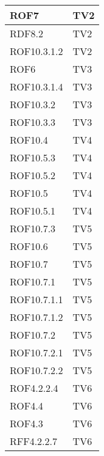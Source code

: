 \begin{center}
\begin{longtable}{|p{7cm}|p{7cm}|}
\midrule
ROF7
& TV2\\

\midrule
RDF8.2
& TV2\\

\midrule
ROF10.3.1.2
& TV2\\

\midrule
ROF6
& TV3\\

\midrule
ROF10.3.1.4
& TV3\\

\midrule
ROF10.3.2
& TV3\\

\midrule
ROF10.3.3
& TV3\\

\midrule
ROF10.4
& TV4\\

\midrule
ROF10.5.3
& TV4\\

\midrule
ROF10.5.2
& TV4\\

\midrule
ROF10.5
& TV4\\

\midrule
ROF10.5.1
& TV4\\

\midrule
ROF10.7.3
& TV5\\

\midrule
ROF10.6
& TV5\\

\midrule
ROF10.7
& TV5\\

\midrule
ROF10.7.1
& TV5\\

\midrule
ROF10.7.1.1
& TV5\\

\midrule
ROF10.7.1.2
& TV5\\

\midrule
ROF10.7.2
& TV5\\

\midrule
ROF10.7.2.1
& TV5\\

\midrule
ROF10.7.2.2
& TV5\\

\midrule
ROF4.2.2.4
& TV6\\

\midrule
ROF4.4
& TV6\\

\midrule
ROF4.3
& TV6\\

\midrule
RFF4.2.2.7
& TV6\\


\end{longtable}
\end{center}
